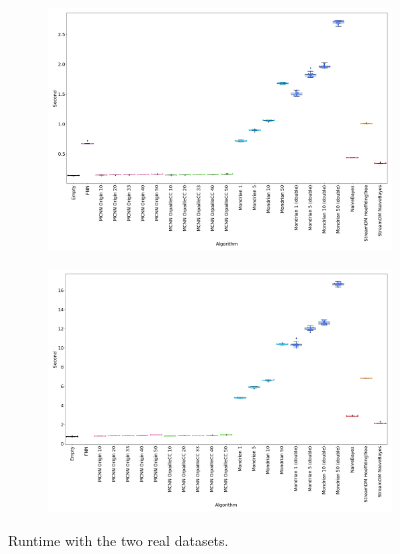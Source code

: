 \begin{figure}
	\begin{subfigure}[t]{.49\linewidth}
		\includegraphics[width=\linewidth]{figures/results/banos_6_runtime.png}
		\caption{\banosdataset}
		\label{fig:runtime-banos}
	\end{subfigure}
	\hfill
	\begin{subfigure}[t]{.49\linewidth}
		\includegraphics[width=\linewidth]{figures/results/recofit_6_runtime.png}
		\caption{\recofitdataset}
		\label{fig:runtime-recofit}
	\end{subfigure}
	\caption{Runtime with the two real datasets. }
	\label{fig:runtime}
\end{figure}

